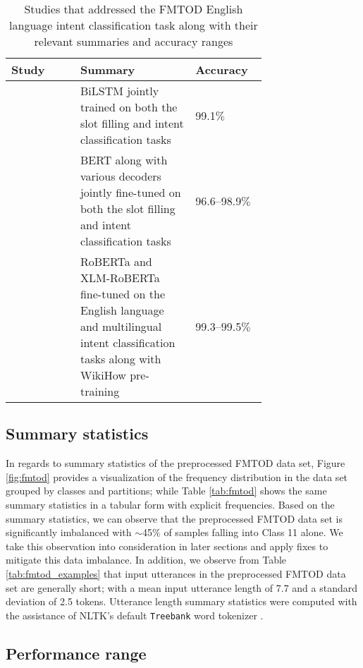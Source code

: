 \begin{table}[t!]
  \centering {}
  \begin{tabular}{L{0.27\linewidth} L{0.45\linewidth} l}
    \toprule
    Study & Summary & Accuracy \\
    \midrule
    \citet{schuster-etal-2019-cross-lingual} & BiLSTM jointly trained on both the slot filling and intent classification tasks & 99.1$\%$ \\
    \citet{zhang2019joint} & BERT along with various decoders jointly fine-tuned on both the slot filling and intent classification tasks & 96.6--98.9$\%$ \\
    \citet{zhang-etal-2020-intent} & RoBERTa and XLM-RoBERTa fine-tuned on the English language and multilingual intent classification tasks along with WikiHow pre-training & 99.3--99.5$\%$ \\
    \bottomrule
  \end{tabular}
  \caption{Studies that addressed the FMTOD English language intent
    classification task along with their relevant summaries and accuracy
    ranges}
  \label{tab:fmtod_results}
\end{table}

\subsection{Summary statistics}

\label{section:fmtod_summary}

In regards to summary statistics of the preprocessed FMTOD data set, Figure
\ref{fig:fmtod} provides a visualization of the frequency distribution in the
data set grouped by classes and partitions; while Table \ref{tab:fmtod} shows
the same summary statistics in a tabular form with explicit frequencies. Based
on the summary statistics, we can observe that the preprocessed FMTOD data set
is significantly imbalanced with $\sim$45$\%$ of samples falling into Class 11
alone. We take this observation into consideration in later sections and apply
fixes to mitigate this data imbalance. In addition, we observe from Table
\ref{tab:fmtod_examples} that input utterances in the preprocessed FMTOD data
set are generally short; with a mean input utterance length of 7.7 and a
standard deviation of 2.5 tokens. Utterance length summary statistics were
computed with the assistance of NLTK's default \texttt{Treebank} word tokenizer
\citep{bird-loper-2004-nltk}.

\subsection{Performance range}

